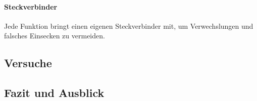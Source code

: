 \documentclass[main.tex]{subfiles} %
\begin{document}
\paragraph{Steckverbinder}
Jede Funktion bringt einen eigenen Steckverbinder mit, um Verwechslungen und
falsches Einsecken zu vermeiden.

\subsection{Versuche}

\subsection{Fazit und Ausblick}

\end{document}
